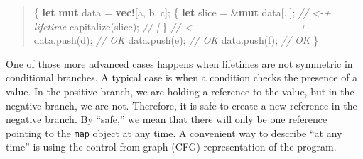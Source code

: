\documentclass[
  11pt,
  twoside,symmetric]{report}
\newenvironment{Shaded}{}{}
\newcommand{\CharTok}[1]{#1}
\newcommand{\CommentTok}[1]{\textit{#1}}
\newcommand{\KeywordTok}[1]{\textbf{#1}}
\newcommand{\NormalTok}[1]{#1}
\newcommand{\OperatorTok}[1]{#1}
\newcommand{\PreprocessorTok}[1]{\textbf{#1}}
\begin{document}
\begin{quote}
\begin{Shaded}
\begin{Highlighting}[]
\OperatorTok{\{}
    \KeywordTok{let} \KeywordTok{mut}\NormalTok{ data }\OperatorTok{=} \PreprocessorTok{vec!}\NormalTok{[}\CharTok{\textquotesingle{}a\textquotesingle{}}\OperatorTok{,} \CharTok{\textquotesingle{}b\textquotesingle{}}\OperatorTok{,} \CharTok{\textquotesingle{}c\textquotesingle{}}\NormalTok{]}\OperatorTok{;}
    \OperatorTok{\{}
        \KeywordTok{let}\NormalTok{ slice }\OperatorTok{=} \OperatorTok{\&}\KeywordTok{mut}\NormalTok{ data[}\OperatorTok{..}\NormalTok{]}\OperatorTok{;} \CommentTok{// \textless{}{-}+ \textquotesingle{}lifetime}
\NormalTok{        capitalize(slice)}\OperatorTok{;}         \CommentTok{//   |}
    \OperatorTok{\}} \CommentTok{// \textless{}{-}{-}{-}{-}{-}{-}{-}{-}{-}{-}{-}{-}{-}{-}{-}{-}{-}{-}{-}{-}{-}{-}{-}{-}{-}{-}{-}{-}{-}{-}+}
\NormalTok{    data}\OperatorTok{.}\NormalTok{push(}\CharTok{\textquotesingle{}d\textquotesingle{}}\NormalTok{)}\OperatorTok{;} \CommentTok{// OK}
\NormalTok{    data}\OperatorTok{.}\NormalTok{push(}\CharTok{\textquotesingle{}e\textquotesingle{}}\NormalTok{)}\OperatorTok{;} \CommentTok{// OK}
\NormalTok{    data}\OperatorTok{.}\NormalTok{push(}\CharTok{\textquotesingle{}f\textquotesingle{}}\NormalTok{)}\OperatorTok{;} \CommentTok{// OK}
\OperatorTok{\}}
\end{Highlighting}
\end{Shaded}
\end{quote}

One of those more advanced cases happens when lifetimes are not
symmetric in conditional branches. A typical case is when a condition
checks the presence of a value. In the positive branch, we are holding a
reference to the value, but in the negative branch, we are not.
Therefore, it is safe to create a new reference in the negative branch.
By ``safe,'' we mean that there will only be one reference pointing to
the \texttt{map} object at any time. A convenient way to describe ``at
any time'' is using the control from graph (CFG) representation of the
program.
\end{document}
